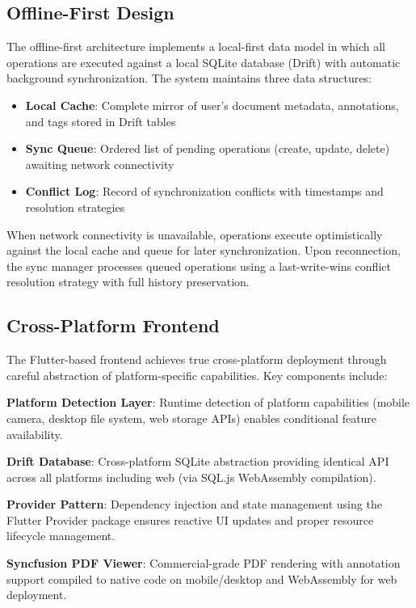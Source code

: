 \documentclass[conference]{IEEEtran}
\begin{document}
\subsection{Offline-First Design}

The offline-first architecture implements a local-first data model in which all operations are executed against a local SQLite database (Drift) with automatic background synchronization. The system maintains three data structures:

\begin{itemize}
\item \textbf{Local Cache}: Complete mirror of user's document metadata, annotations, and tags stored in Drift tables
\item \textbf{Sync Queue}: Ordered list of pending operations (create, update, delete) awaiting network connectivity
\item \textbf{Conflict Log}: Record of synchronization conflicts with timestamps and resolution strategies
\end{itemize}

When network connectivity is unavailable, operations execute optimistically against the local cache and queue for later synchronization. Upon reconnection, the sync manager processes queued operations using a last-write-wins conflict resolution strategy with full history preservation.

\subsection{Cross-Platform Frontend}

The Flutter-based frontend achieves true cross-platform deployment through careful abstraction of platform-specific capabilities. Key components include:

\textbf{Platform Detection Layer}: Runtime detection of platform capabilities (mobile camera, desktop file system, web storage APIs) enables conditional feature availability.

\textbf{Drift Database}: Cross-platform SQLite abstraction providing identical API across all platforms including web (via SQL.js WebAssembly compilation).

\textbf{Provider Pattern}: Dependency injection and state management using the Flutter Provider package ensures reactive UI updates and proper resource lifecycle management.

\textbf{Syncfusion PDF Viewer}: Commercial-grade PDF rendering with annotation support compiled to native code on mobile/desktop and WebAssembly for web deployment.
\end{document}
